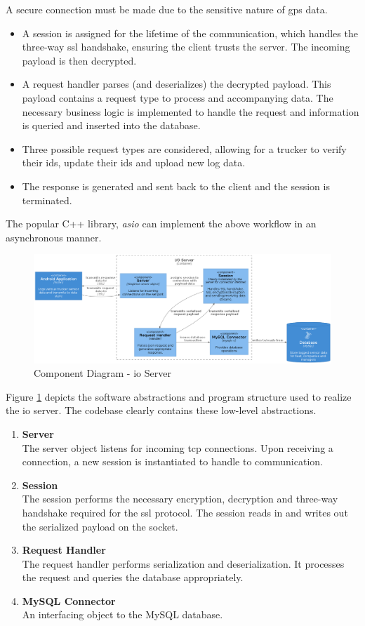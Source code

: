 A secure connection must be made due to the sensitive nature of \ac{gps} data.
\begin{itemize}
\item A session is assigned for the lifetime of the communication, which handles the three-way \ac{ssl} handshake, ensuring the client trusts the server. The incoming payload is then decrypted.
\item A request handler parses (and deserializes) the decrypted payload.
This payload contains a request type to process and accompanying data.
The necessary business logic is implemented to handle the request and information is queried and inserted into the database.
\item Three possible request types are considered, allowing for a trucker to verify their \ac{id}s, update their \ac{id}s and upload new log data.
\item The response is generated and sent back to the client and the session is terminated.
\end{itemize}

The popular C++ library, \textit{asio} can implement the above workflow in an asynchronous manner.

\begin{figure}[H]
\centering
\includegraphics[width=6in]{../diag/IO_component.png}
\caption{Component Diagram - \Ac{io} Server}
\label{fig:IO_component}
\end{figure}

Figure \ref{fig:IO_component} depicts the software abstractions and program structure used to realize the \ac{io} server.
The codebase clearly contains these low-level abstractions.
\begin{enumerate}
\item \textbf{Server}\\
The server object listens for incoming \ac{tcp} connections.
Upon receiving a connection, a new session is instantiated to handle to communication.
\item \textbf{Session}\\
The session performs the necessary encryption, decryption and three-way handshake required for the \ac{ssl} protocol.
The session reads in and writes out the serialized payload on the socket.
\item \textbf{Request Handler}\\
The request handler performs serialization and deserialization.
It processes the request and queries the database appropriately.
\item \textbf{MySQL Connector}\\
An interfacing object to the MySQL database.
\end{enumerate}

